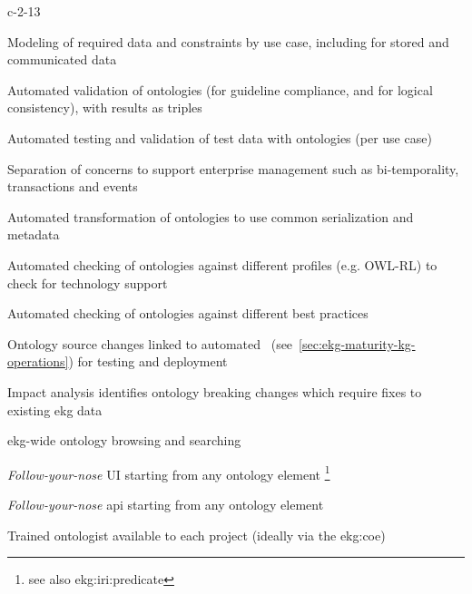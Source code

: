 \begin{level-assessment}{c-2-1}{3}

    \item Modeling of required data and constraints by use case, including for stored and communicated data
    \item Automated validation of ontologies (for guideline compliance, and for logical consistency),
          with results as triples
    \item Automated testing and validation of test data with ontologies (per use case)
    \item Separation of concerns to support enterprise management such as
          bi-temporality, transactions and events
    \item Automated transformation of ontologies to use common serialization and metadata
    \item Automated checking of ontologies against different profiles (e.g. OWL-RL)
          to check for technology support
    \item Automated checking of ontologies against different best practices
    \item Ontology source changes linked to automated~
          (see~\ref{sec:ekg-maturity-kg-operations}) for testing and deployment
    \item Impact analysis identifies ontology breaking changes which require fixes to existing \gls{ekg} data
    \item \Gls{ekg}-wide ontology browsing and searching
    \item \textit{Follow-your-nose} UI starting from any
          ontology element \footnote{\label{foot:predicate-iri}see also \gls{ekg:iri:predicate}}
    \item \textit{Follow-your-nose} \gls{api} starting from any
          ontology element 
    \item Trained ontologist available to each project (ideally via the \gls{ekg:coe})

\end{level-assessment}

